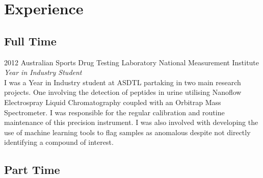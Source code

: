 \documentclass{friggeri-cv} %
\begin{document}


\section{Experience}

\subsection{Full Time}

\begin{entrylist}


\entry
{2012}
{Australian Sports Drug Testing Laboratory}
{National Measurement Institute}
{\emph{Year in Industry Student} \\
I was a Year in Industry student at ASDTL partaking in two main research projects. One involving the detection of peptides in urine utilising Nanoflow Electrospray Liquid Chromatography coupled with an Orbitrap Mass Spectrometer. I was responsible for the regular calibration and routine maintenance of this precision instrument. I was also involved with developing the use of machine learning tools to flag samples as anomalous despite not directly identifying a compound of interest.}


\end{entrylist}
\pagebreak
\subsection{Part Time}
\end{document}
